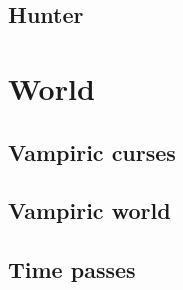 \documentclass[a4paper, 12pt, finnish]{article}
\begin{document}
	\subsection{Hunter}\label{ssec:hunter}
		
\section{World}
	\subsection{Vampiric curses} \label{ssec:curses} %
		
	\subsection{Vampiric world} \label{ssec:vampire_world}
		
	\subsection{Time passes} \label{ssec:time_passes}
		
\end{document}
